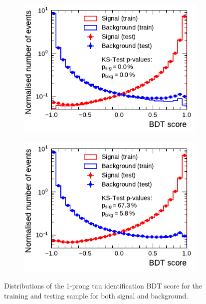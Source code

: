 \begin{figure}[htb]
  \begin{subfigure}[t]{0.48\textwidth}
    \centering
    \includegraphics{./figures/bdt_perf/scores/grid_1p0304.pdf}
    \label{fig:bdt_score_1p}
  \end{subfigure}\hfill
  \begin{subfigure}[t]{0.48\textwidth}
    \centering
    \includegraphics{./figures/bdt_perf/scores/grid_1p_subsampling0269.pdf}
    \label{fig:bdt_score_1p_ks5}
  \end{subfigure}
  \caption{Distributions of the 1-prong tau identification BDT score for the
    training and testing sample for both signal and background.}
  \label{fig:bdt_overfitting_scores}
\end{figure}

